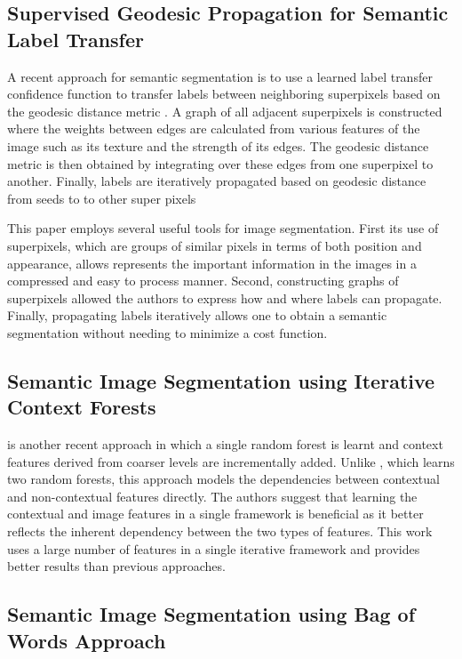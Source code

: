 \documentclass{article} %
\begin{document}
\subsection{Supervised Geodesic Propagation for Semantic Label Transfer}
\label{sec:Geo}

A recent approach for semantic segmentation is to use a learned label transfer confidence function to transfer labels between neighboring superpixels based on the geodesic distance metric \cite{Chen2012}.  A graph of all adjacent superpixels is constructed where the weights between edges are calculated from various features of the image such as its texture and the strength of its edges. The geodesic distance metric is then obtained by integrating over these edges from one superpixel to another. Finally, labels are iteratively propagated based on geodesic distance from seeds to to other super pixels

This paper employs several useful tools for image segmentation. First its use of superpixels, which are groups of similar pixels in terms of both position and appearance, allows represents the important information in the images in a compressed and easy to process manner. Second, constructing graphs of superpixels allowed the authors to express how and where labels can propagate. Finally, propagating labels iteratively allows one to obtain a semantic segmentation without needing to minimize a cost function.

\subsection{Semantic Image Segmentation using Iterative Context Forests}
\label{sec:RandFor}

\cite{IterContFor12} is another recent approach in which a single random forest is learnt and context features derived from coarser levels are incrementally added. Unlike \cite{Shotton06textonboost:joint}, which learns two random forests, this approach models the dependencies between contextual and non-contextual features directly. The authors suggest that learning the contextual and image features in a single framework is beneficial as it better reflects the inherent dependency between the two types of features. This work uses a large number of features in a single iterative framework and provides better results than previous approaches.

\subsection{Semantic Image Segmentation using Bag of Words Approach}
\label{sec:bagofwords}
\end{document}
